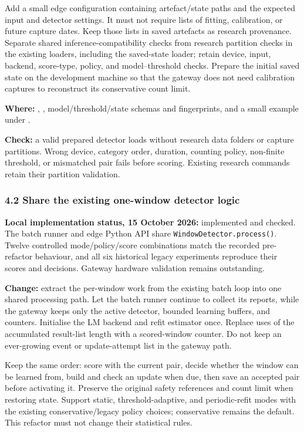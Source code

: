 \documentclass[11pt,a4paper]{article}
\begin{document}
Add a small edge configuration containing artefact/state paths and the expected
input and detector settings. It must not require lists of fitting, calibration,
or future capture dates. Keep those lists in saved artefacts as research
provenance. Separate shared inference-compatibility checks from research
partition checks in the existing loaders, including the saved-state loader;
retain device, input, backend, score-type, policy, and model--threshold checks.
Prepare the initial saved state on the development machine so that the gateway
does not need calibration captures to reconstruct its conservative count limit.

\textbf{Where:} ,
, model/threshold/state schemas and fingerprints,
and a small example under .

\textbf{Check:} a valid prepared detector loads without research data folders or
capture partitions. Wrong device, category order, duration, counting policy,
non-finite threshold, or mismatched pair fails before scoring. Existing research
commands retain their partition validation.

\subsubsection*{4.2 Share the existing one-window detector logic}

\textbf{Local implementation status, 15 October 2026:} implemented and checked.
The batch runner and edge Python API share \texttt{WindowDetector.process()}.
Twelve controlled mode/policy/score combinations match the recorded pre-refactor
behaviour, and all six historical legacy experiments reproduce their scores and
decisions. Gateway hardware validation remains outstanding.

\textbf{Change:} extract the per-window work from the existing batch loop into
one shared processing path. Let the batch runner continue to collect its reports,
while the gateway keeps only the active detector, bounded learning buffers,
and counters. Initialise the LM backend and refit estimator once. Replace uses
of the accumulated result-list length with a scored-window counter. Do not keep
an ever-growing event or update-attempt list in the gateway path.

Keep the same order: score with the current pair, decide whether the window can
be learned from, build and check an update when due, then save an accepted pair
before activating it. Preserve the original safety references and count limit
when restoring state. Support static, threshold-adaptive, and periodic-refit
modes with the existing conservative/legacy policy choices; conservative remains
the default. This refactor must not change their statistical rules.
\end{document}
